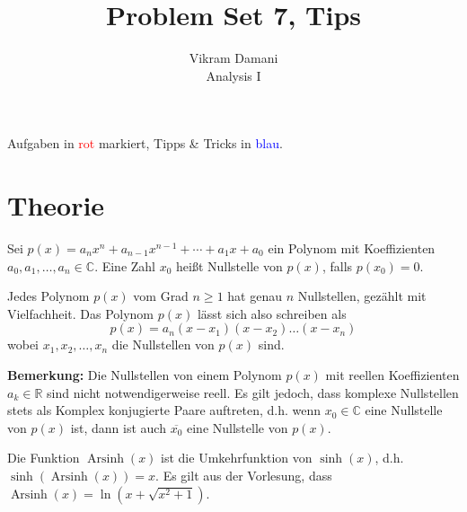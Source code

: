 \documentclass[12pt]{article}
\DeclareMathOperator{\arcsinh}{Arsinh}
\newcommand{\R}{\mathbb{R}} %
\newcommand{\C}{\mathbb{C}}
\newenvironment{definition}[2][Definition]{\begin{trivlist}
        \item[\hskip \labelsep {\bfseries #1}\hskip \labelsep {\bfseries #2.}]}{\flushright{$\square$}\end{trivlist}}
\newenvironment{remark}[2][Bemerkung]{\begin{trivlist}
        \item[\hskip \labelsep {\bfseries #1}\hskip \labelsep {\bfseries #2.}]}{\end{trivlist}}
\begin{document}
\title{Problem Set 7, Tips}
\author{Vikram Damani\\
        Analysis I}

\maketitle
Aufgaben in \textcolor{red}{rot} markiert, Tipps \& Tricks in \textcolor{blue}{blau}.

\section{Theorie}

\begin{definition}{[Fundamentalsatz der Algebra]}
        Sei $p(x)=a_n x^n+a_{n-1}x^{n-1}+ \cdots +a_1x+a_0$ ein Polynom mit Koeffizienten $a_0,a_1,\ldots,a_n\in\C$. Eine Zahl $x_0$ heißt Nullstelle von $p(x)$, falls $p(x_0)=0$.

        Jedes Polynom $p(x)$ vom Grad $n\geq 1$ hat genau $n$ Nullstellen, gezählt mit
        Vielfachheit. Das Polynom $p(x)$ lässt sich also schreiben als
        \begin{equation}
                p(x)=a_n(x-x_1)(x-x_2)\ldots(x-x_n)
        \end{equation}
        wobei $x_1,x_2,\ldots,x_n$ die Nullstellen von $p(x)$ sind.

        \textbf{Bemerkung:} Die Nullstellen von einem Polynom $p(x)$ mit reellen Koeffizienten $a_k\in\R$ sind nicht notwendigerweise reell. Es gilt jedoch, dass komplexe Nullstellen stets als Komplex konjugierte Paare auftreten, d.h. wenn $x_0\in\C$ eine Nullstelle von $p(x)$ ist, dann ist auch $\overline{x_0}$ eine Nullstelle von $p(x)$.
\end{definition}

\begin{remark}{[$\arcsinh$]}
        Die Funktion $\arcsinh(x)$ ist die Umkehrfunktion von $\sinh(x)$, d.h. $\sinh(\arcsinh(x))=x$.
        Es gilt aus der Vorlesung, dass $\arcsinh(x) = \ln(x + \sqrt{x^2 + 1})$.
\end{remark}
\end{document}
